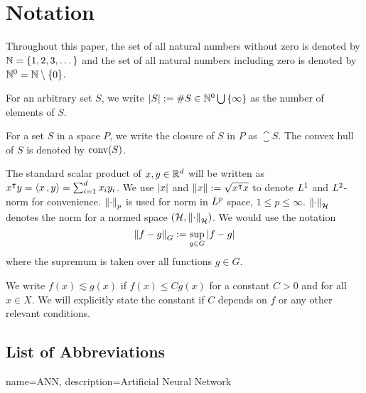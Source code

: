 \chapter*{Notation}
\label{c:Notation}


Throughout this paper, the set of all natural numbers without zero is denoted by
$\mathbb{N} = \{1,2,3,\dots\}$ and the set of all natural numbers including zero is
denoted by $\mathbb{N}^0 = \mathbb{N} \setminus \{0\}$. 

For an arbitrary set $S$, we write $\left| S \right| := \# S \in \mathbb{N}^0 \bigcup\,
\{\infty\}$ as the number of elements of $S$.

For a set $S$ in a space $P$, we write the closure of $S$ in $P$ as
$\closure{S}$. The convex hull of $S$ is denoted by $\textrm{conv}(S)$.

The standard scalar product of $x,y\in\mathbb{R}^d$ will be written as $x{}^{\intercal} y =
\left\langle x\, , y \right\rangle = \sum_{i=1}^d x_iy_i$. We use $\left| x \right|$ and $\left\| x \right\| := \sqrt{x{}^{\intercal}
x}$ to denote $L^{1}$ and $L^{2}$-norm for convenience. $\left\| \cdot \right\|_{p}$ is
used for norm in $L^{p}$ space, $1 \leq p \leq \infty$.
$\left\| \cdot \right\|_{\mathcal{H}}$ denotes the norm for a normed space $(\mathcal{H},
\left\| \cdot \right\|_{\mathcal{H}})$. We would use the notation
\begin{equation}
    \left\| f - g \right\|_{G} := \sup_{g\in G} \left| f - g \right|
\end{equation}
where the supremum is taken over all functions $g \in G$.

We write $f(x) \lesssim g(x)$ if $f(x) \leq C g(x)$ for a constant $C>0$ and for
all $x \in X$. We will explicitly state the constant if $C$ depends on $f$ or
any other relevant conditions.

\section*{List of Abbreviations}

\printglossary

{
    name=ANN,
    description={Artificial Neural Network}
}





